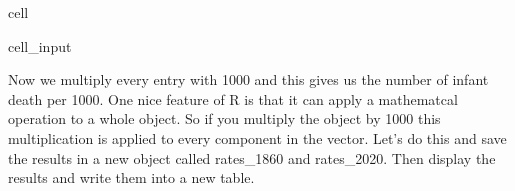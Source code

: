 \documentclass[letterpaper,10pt,english]{jupyterBook}
\begin{document}
\begin{sphinxuseclass}{cell}\begin{sphinxVerbatimInput}

\begin{sphinxuseclass}{cell_input}
\begin{sphinxVerbatim}[commandchars=\\\{\}]
\end{sphinxVerbatim}

\end{sphinxuseclass}\end{sphinxVerbatimInput}

\end{sphinxuseclass}
\sphinxAtStartPar
Now we multiply every entry with 1000 and this gives us the number of infant death per 1000. One nice feature of R is that it can apply a mathematcal operation to a whole object. So if you multiply the object by 1000 this multiplication is applied to every component in the vector. Let’s do this and save the results in a new object
called rates\_1860 and rates\_2020. Then display the results and write them into a new table.
\end{document}
